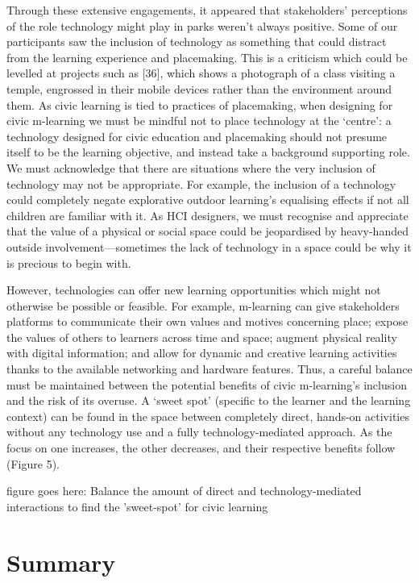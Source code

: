 Through these extensive engagements, it appeared that stakeholders’ perceptions
of the role technology might play in parks weren’t always positive. Some of our
participants saw the inclusion of technology as something that could distract
from the learning experience and placemaking. This is a criticism which could be
levelled at projects such as [36], which shows a photograph of a class visiting
a temple, engrossed in their mobile devices rather than the environment around
them. As civic learning is tied to practices of placemaking, when designing for
civic m-learning we must be mindful not to place technology at the ‘centre’: a
technology designed for civic education and placemaking should not presume
itself to be the learning objective, and instead take a background supporting
role. We must acknowledge that there are situations where the very inclusion of
technology may not be appropriate. For example, the inclusion of a technology
could completely negate explorative outdoor learning’s equalising effects if not
all children are familiar with it. As HCI designers, we must recognise and
appreciate that the value of a physical or social space could be jeopardised by
heavy-handed outside involvement—sometimes the lack of technology in a space
could be why it is precious to begin with.

However, technologies can offer new learning opportunities which might not
otherwise be possible or feasible. For example, m-learning can give stakeholders
platforms to communicate their own values and motives concerning place; expose
the values of others to learners across time and space; augment physical reality
with digital information; and allow for dynamic and creative learning activities
thanks to the available networking and hardware features. Thus, a careful
balance must be maintained between the potential benefits of civic m-learning’s
inclusion and the risk of its overuse. A ‘sweet spot’ (specific to the learner
and the learning context) can be found in the space between completely direct,
hands-on activities without any technology use and a fully technology-mediated
approach. As the focus on one increases, the other decreases, and their
respective benefits follow (Figure 5). 

figure goes here: Balance the amount of direct and technology-mediated interactions to find the 'sweet-spot' for civic learning

\section{Summary}

